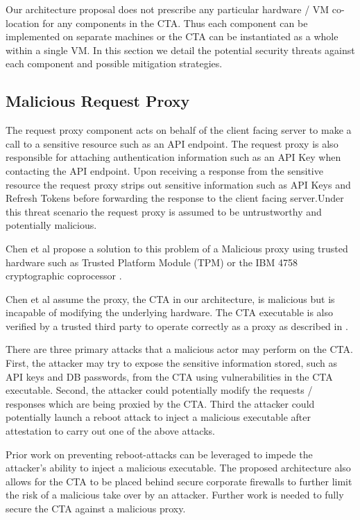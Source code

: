 \documentclass{sig-alternate-05-2015}
\begin{document}
Our architecture proposal does not prescribe any particular hardware / VM co-location for any components in the CTA. Thus each component can be implemented on separate machines or the CTA can be instantiated as a whole within a single VM. In this section we detail the potential security threats against each component and possible mitigation strategies.

\subsection{Malicious Request Proxy}

The request proxy component acts on behalf of the client facing server to make a call to a sensitive resource such as an API endpoint. The request proxy is also responsible for attaching authentication information such as an API Key when contacting the API endpoint. Upon receiving a response from the sensitive resource the request proxy strips out sensitive information such as API Keys and Refresh Tokens before forwarding the response to the client facing server.Under this threat scenario the request proxy is assumed to be untrustworthy and potentially malicious.

Chen et al \cite{chen_towards_2012} propose a solution to this problem of a Malicious proxy using trusted hardware such as Trusted Platform Module (TPM) or the IBM 4758 cryptographic coprocessor \cite{parno_bootstrapping_2010}. 

Chen et al assume the proxy, the CTA in our architecture, is malicious but is incapable of modifying the underlying hardware. The CTA executable is also verified by a trusted third party to operate correctly as a proxy as described in \cite{parno_bootstrapping_2010}.

There are three primary attacks that a malicious actor may perform on the CTA. First, the attacker may try to expose the sensitive information stored, such as API keys and DB passwords, from the CTA using vulnerabilities in the CTA executable. Second, the attacker could potentially modify the requests / responses which are being proxied by the CTA. Third the attacker could potentially launch a reboot attack to inject a malicious executable after attestation to carry out one of the above attacks.

Prior work \cite{libert_tracing_2008, mccune_flicker:_2008} on preventing reboot-attacks can be leveraged to impede the attacker's ability to inject a malicious executable. The proposed architecture also allows for the CTA to be placed behind secure corporate firewalls to further limit the risk of a malicious take over by an attacker. Further work is needed to fully secure the CTA against a malicious proxy.
\end{document}
